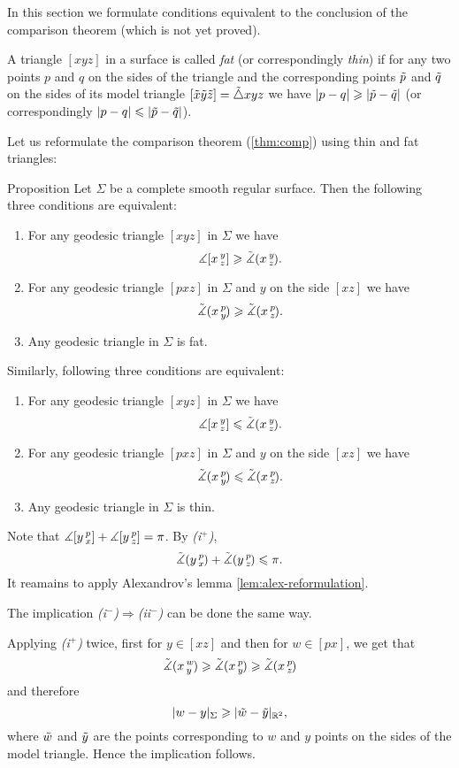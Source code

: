 In this section we formulate conditions equivalent to the conclusion of the comparison theorem
(which is not yet proved).

A triangle $[xyz]$ in a surface is called \emph{fat} (or correspondingly \emph{thin})
if for any two points $p$ and $q$ on the sides of the triangle and the corresponding points 
$\~p$ and $\~q$ on the sides of its model triangle $[\~x\~y\~z]\z=\~\triangle xyz$ we have
$|p-q|\ge |\~p-\~q|$ (or correspondingly $|p-q|\le |\~p-\~q|$).

Let us reformulate the comparison theorem (\ref{thm:comp}) using thin and fat triangles:

\begin{thm}{Proposition}
Let $\Sigma$ be a complete smooth regular surface.
Then the following three conditions are equivalent:
\begin{enumerate}[(i$^{+}$)]
\item For any geodesic triangle $[xyz]$ in $\Sigma$ we have
 \[\measuredangle\hinge {x}{y}{z}\ge\angk xyz.\]
\item For any geodesic triangle $[pxz]$ in $\Sigma$ and $y$ on the side $[xz]$ we have
 \[\angk xpy \ge \angk xpz.\]
\item Any geodesic triangle in $\Sigma$ is fat.
\end{enumerate}

\medskip

Similarly, following three conditions are equivalent:
\begin{enumerate}[(i$^{-}$)]
\item For any geodesic triangle $[xyz]$ in $\Sigma$ we have
 \[\measuredangle\hinge {x}{y}{z}\le\angk xyz.\]
\item For any geodesic triangle $[pxz]$ in $\Sigma$ and $y$ on the side $[xz]$ we have
 \[\angk xpy \le \angk xpz.\]
\item Any geodesic triangle in $\Sigma$ is thin.
\end{enumerate}

\end{thm}

Note that $\measuredangle\hinge ypx+\measuredangle\hinge ypz=\pi$.
By \textit{(i$^{+}$)}, 
\[\angk ypx+\angk ypz\le \pi.\]
It reamains to apply Alexandrov's lemma \ref{lem:alex-reformulation}.

The implication \textit{(i$^{-}$)$\Longrightarrow$(ii$^{-}$)} can be done the same way.

Applying \textit{(i$^{+}$)} twice, first for $y\in [xz]$ and then for $w\in [px]$, we get that
\[\angk xwy \ge \angk xpy \ge \angk xpz\]
and therefore
\[|w-y|_\Sigma\ge |\~w-\~y|_{\RR^2},\]
where $\~w$ and $\~y$ are the points corresponding to $w$ and $y$ points on the sides of the model triangle. Hence the implication follows.


